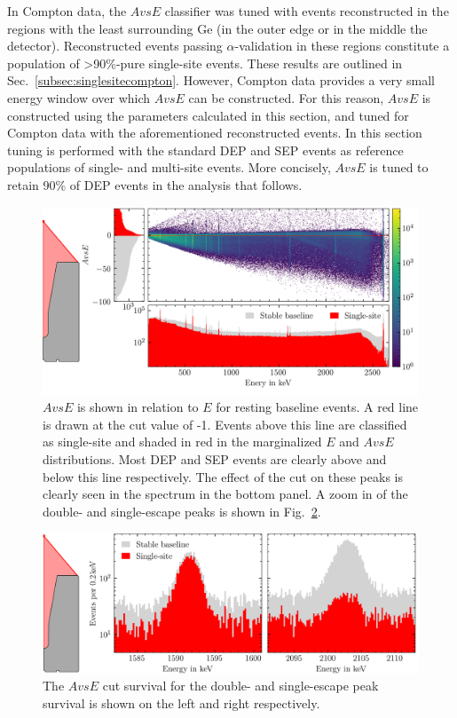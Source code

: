 In Compton data, the $AvsE$ classifier was tuned with events reconstructed in the regions with the least surrounding Ge (in the outer edge or in the middle the detector). Reconstructed events passing $\alpha$-validation in these regions constitute a population of >90\%-pure single-site events. These results are outlined in Sec.~\ref{subsec:singlesitecompton}. However, Compton data provides a very small energy window over which $AvsE$ can be constructed. For this reason, $AvsE$ is constructed using the parameters calculated in this section, and tuned for Compton data with the aforementioned reconstructed events. In this section tuning is performed with the standard DEP and SEP events as reference populations of single- and multi-site events. More concisely, $AvsE$ is tuned to retain 90\% of DEP events in the analysis that follows. 
\begin{figure}[htb]
    \centering
    \includegraphics[width=6in]{figs/param/avse_cut.png}
    \caption{$AvsE$ is shown in relation to $E$ for resting baseline events. A red line is drawn at the cut value of -1. Events above this line are classified as single-site and shaded in red in the marginalized $E$ and $AvsE$ distributions. Most DEP and SEP events are clearly above and below this line respectively. The effect of the cut on these peaks is clearly seen in the spectrum in the bottom panel. A zoom in of the double- and single-escape peaks is shown in Fig.~\ref{fig:avse_cut_peaks}.}
    \label{fig:avse_cut}
\end{figure}
\begin{figure}[htb]
    \centering
    \includegraphics[width=6in]{figs/param/avse_escape_peaks.png}
    \caption{The $AvsE$ cut survival for the double- and single-escape peak survival is shown on the left and right respectively.}
    \label{fig:avse_cut_peaks}
\end{figure}

